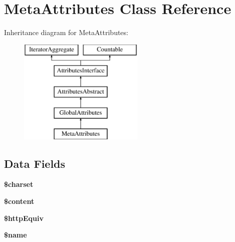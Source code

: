 \hypertarget{class_pes_1_1_dom_1_1_node_1_1_attributes_1_1_meta_attributes}{}\section{Meta\+Attributes Class Reference}
\label{class_pes_1_1_dom_1_1_node_1_1_attributes_1_1_meta_attributes}
Inheritance diagram for Meta\+Attributes\+:\begin{figure}[H]
\begin{center}
\leavevmode
\includegraphics[height=5.000000cm]{class_pes_1_1_dom_1_1_node_1_1_attributes_1_1_meta_attributes}
\end{center}
\end{figure}
\subsection*{Data Fields}
\begin{DoxyCompactItemize}
\item 
\mbox{\label{class_pes_1_1_dom_1_1_node_1_1_attributes_1_1_meta_attributes_af10158dd74b75f1d337e83102d6b82ce}} 
{\bfseries \$charset}
\item 
\mbox{\label{class_pes_1_1_dom_1_1_node_1_1_attributes_1_1_meta_attributes_a57b284fe00866494b33afa80ba729bed}} 
{\bfseries \$content}
\item 
\mbox{\label{class_pes_1_1_dom_1_1_node_1_1_attributes_1_1_meta_attributes_abd17e4049be5ac321604d3f61cf466f4}} 
{\bfseries \$http\+Equiv}
\item 
\mbox{\label{class_pes_1_1_dom_1_1_node_1_1_attributes_1_1_meta_attributes_ab2fc40d43824ea3e1ce5d86dee0d763b}} 
{\bfseries \$name}
\end{DoxyCompactItemize}
